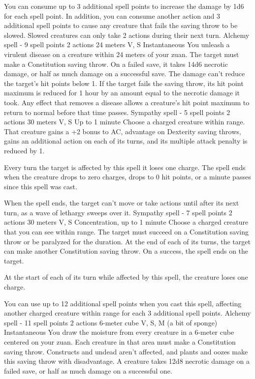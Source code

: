     You can consume up to 3 additional spell points to increase the damage by 1d6 for each spell point.
    In addition, you can consume another action and 3 additional spell points to cause any creature that fails the saving throw to be slowed.
    Slowed creatures can only take 2 actions during their next turn.
    {Alchemy spell - 9 spell points}
    {2 actions}
    {24 meters}
    {V, S}
    {Instantaneous}
    You unleash a virulent disease on a creature within 24 meters of your zuan.
    The target must make a Constitution saving throw.
    On a failed save, it takes 14d6 necrotic damage, or half as much damage on a successful save.
    The damage can't reduce the target's hit points below 1.
    If the target fails the saving throw, its hit point maximum is reduced for 1 hour by an amount equal to the necrotic damage it took.
    Any effect that removes a disease allows a creature's hit point maximum to return to normal before that time passes.
    {Sympathy spell - 5 spell points}
    {2 actions}
    {30 meters}
    {V, S}
    {Up to 1 minute}
    Choose a charged creature within range.
    That creature gains a +2 bonus to AC, advantage on Dexterity saving throws, gains an additional action on each of its turns, and its multiple attack penalty is reduced by 1.

    Every turn the target is affected by this spell it loses one charge.
    The spell ends when the creature drops to zero charges, drops to 0 hit points, or a minute passes since this spell was cast.

    When the spell ends, the target can't move or take actions until after its next turn, as a wave of lethargy sweeps over it.
    {Sympathy spell - 7 spell points}
    {2 actions}
    {30 meters}
    {V, S}
    {Concentration, up to 1 minute}
    Choose a charged creature that you can see within range.
    The target must succeed on a Constitution saving throw or be paralyzed for the duration.
    At the end of each of its turns, the target can make another Constitution saving throw.
    On a success, the spell ends on the target.

    At the start of each of its turn while affected by this spell, the creature loses one charge.

    You can use up to 12 additional spell points when you cast this spell, affecting another charged creature within range for each 3 additional spell points.
    {Alchemy spell - 11 spell points}
    {2 actions}
    {6-meter cube}
    {V, S, M (a bit of sponge)}
    {Instantaneous}
    You draw the moisture from every creature in a 6-meter cube centered on your zuan.
    Each creature in that area must make a Constitution saving throw.
    Constructs and undead aren't affected, and plants and oozes make this saving throw with disadvantage.
    A creature takes 12d8 necrotic damage on a failed save, or half as much damage on a successful one.

